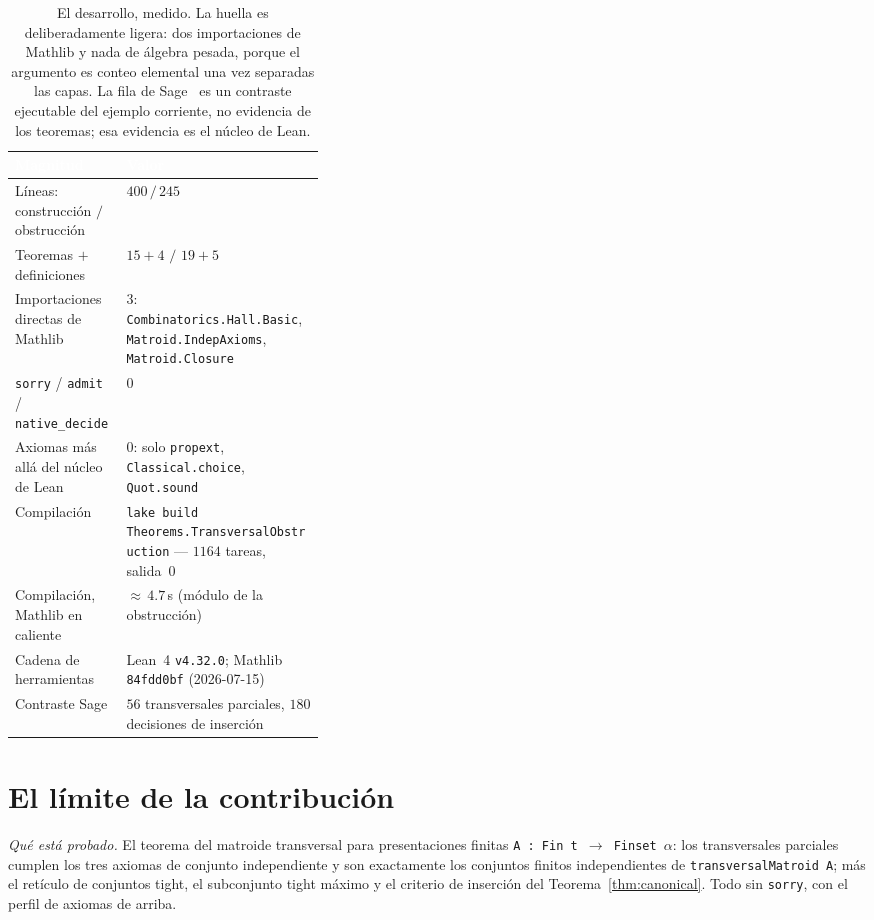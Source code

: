 \documentclass[11pt]{article}
\newcommand{\lean}[1]{\texttt{#1}}
\begin{document}
\begin{table}[H]
  \centering\footnotesize
  \begin{tabularx}{0.96\linewidth}{@{}>{\raggedright\arraybackslash}p{0.36\linewidth}X@{}}
    \toprule
    \rowcolor{tmteal}
    \textcolor{white}{\textbf{Magnitud}} & \textcolor{white}{\textbf{Valor}} \\
    \midrule
    \rowcolor{tmband}
    Líneas: construcción $/$ obstrucción & $400\,/\,245$ \\
    Teoremas $+$ definiciones & $15{+}4$ $/$ $19{+}5$ \\
    \rowcolor{tmband}
    Importaciones directas de Mathlib & $3$: \lean{Combinatorics.Hall.Basic},
      \lean{Matroid.IndepAxioms}, \lean{Matroid.Closure} \\
    \lean{sorry} / \lean{admit} / \lean{native\_decide} & $0$ \\
    \rowcolor{tmband}
    Axiomas más allá del núcleo de Lean & $0$: solo \lean{propext}, \lean{Classical.choice},
      \lean{Quot.sound} \\
    Compilación & \lean{lake build}
      \lean{Theorems.TransversalObstruction} --- $1164$ tareas, salida~$0$ \\
    \rowcolor{tmband}
    Compilación, Mathlib en caliente & ${\approx}\,4.7$\,s (módulo de la obstrucción) \\
    Cadena de herramientas & Lean~4 \lean{v4.32.0}; Mathlib \lean{84fdd0bf} (2026-07-15) \\
    \rowcolor{tmband}
    Contraste Sage & $56$ transversales parciales, $180$ decisiones de inserción \\
    \bottomrule
  \end{tabularx}
  \caption{El desarrollo, medido. La huella es deliberadamente ligera: dos importaciones de
  Mathlib y nada de álgebra pesada, porque el argumento es conteo elemental una vez separadas las
  capas. La fila de Sage~\cite{sage} es un contraste ejecutable del ejemplo corriente, no evidencia
  de los teoremas; esa evidencia es el núcleo de Lean.}
  \label{tab:metrics}
\end{table}

\section{El límite de la contribución}\label{sec:boundary}

\emph{Qué está probado.} El teorema del matroide transversal para presentaciones finitas
\lean{A : Fin t $\to$ Finset $\alpha$}: los transversales parciales cumplen los tres axiomas de
conjunto independiente y son exactamente los conjuntos finitos independientes de
\lean{transversalMatroid A}; más el retículo de conjuntos tight, el subconjunto tight máximo y el
criterio de inserción del Teorema~\ref{thm:canonical}. Todo sin \lean{sorry}, con el perfil de
axiomas de arriba.
\end{document}

